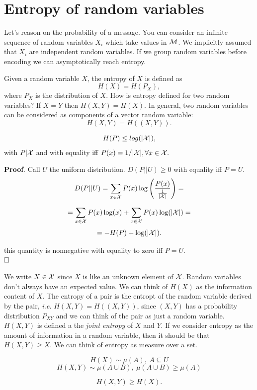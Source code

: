 \chapter{Entropy of random variables}

Let's reason on the probability of a message. You can consider an infinite sequence of random variables $X_i$ which take values in $\mathcal{M}$. We implicitly assumed that $X_i$ are independent random variables. If we group random variables before encoding we can asymptotically reach entropy.

Given a random variable $X$, the entropy of $X$ is defined as $$H(X) = H(P_X),$$ where $P_X$ is the distribution of $X$. How is entropy defined for two random variables? If $X=Y$ then $H(X, Y) = H(X).$ In general, two random variables can be considered as components of a vector random variable: $$H(X, Y) = H((X, Y)).$$

\begin{prop}
 $$H(P) \leq log(|\mathcal{X}|),$$ with $P|\mathcal{X}$ and with equality iff $P(x) = {1}/{|\mathcal{X}|}, \forall x \in \mathcal{X}.$
\end{prop}
\noindent\textbf{Proof}. Call $U$ the uniform distribution. $D(P||U)\geq 0$ with equality iff $P = U$.
\[
 D(P||U) = \sum_{x \in \mathcal{X}} P(x)\log\left(\dfrac{P(x)}{\frac{1}{|\mathcal{X}|}}\right) =
\]

\[
 = \sum_{x \in \mathcal{X}} P(x)\log(x) + \sum_{x\in\mathcal{X}} P(x)\log(|\mathcal{X}|) =
\]
\[
 = -H(P) + \log(|\mathcal{X}|).
\]

this quantity is nonnegative with equality to zero iff $P=U.$\\

$\hfill\Box$

We write $X \in \mathcal{X}$ since $X$ is like an unknown element of $\mathcal{X}$. Random variables don't always have an expected value. We can think of $H(X)$ as the information content of $X$. The entropy of a pair is the entropt of the random variable derived by the pair, \emph{i.e.} $H(X, Y) = H((X, Y))$, since $(X, Y)$ has a probability distribution $P_{XY}$ and we can think of the pair as just a random variable. $H(X, Y)$ is defined a the \emph{joint entropy} of $X$ and $Y$. If we consider entropy as the amount of information in a random variable, then it should be that $H(X, Y) \geq X$. We can think of entropy as  measure over a set.

\[
 H(X) \sim \mu(A),\ A \subseteq U
\]
\[
H(X, Y) \sim \mu(A \cup B),\ \mu(A \cup B) \geq \mu(A)
\]

\begin{prop}
  $$H(X, Y) \geq H(X).$$
\end{prop}

